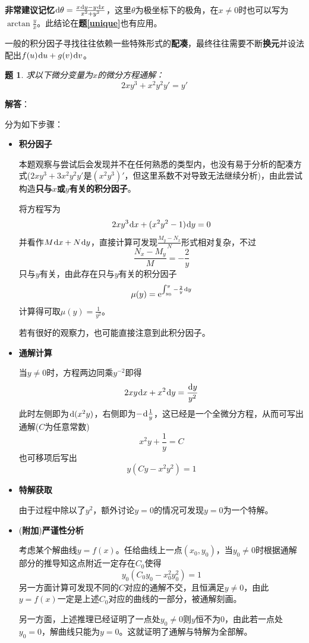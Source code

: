 \documentclass[a4paper,UTF8,fontset=windows,AutoFakeBold]{ctexart}
\newcommand*{\dr}{\hspace{0.07em}\mathrm{d}}
\newcommand*{\er}{\mathrm{e}}
\newcommand*{\extra}{\textbf{附加}}
\newcommand*{\note}{\noindent *}
\theoremstyle{ex}
\newtheorem{exercise}{题}
\newcommand{\exref}[1]{\textbf{题\;\ref{#1}\;}}
\newcommand{\sol}[1]{{\vspace{5pt}\kaishu\noindent\textbf{解答}：\vspace{-3pt}
\begin{compactitem}
    \item[] #1
\end{compactitem}
}}
\begin{document}
\note \textbf{非常建议记忆}$\dr\theta=\frac{x\dr y-y\dr x}{x^2+y^2}$，这里$\theta$为极坐标下的极角，在$x\ne0$时也可以写为$\arctan\frac{y}{x}$。此结论在\exref{unique}也有应用。

\note 一般的积分因子寻找往往依赖一些特殊形式的\textbf{配凑}，最终往往需要不断\textbf{换元}并设法配出$f(u)\dr u+g(v)\dr v$。

\begin{framed}
\begin{exercise}
    求以下微分变量为$x$的微分方程通解：
    $$2xy^3+x^2y^2y'=y'$$
\end{exercise}
\sol{
    分为如下步骤：
    \begin{itemize}
        \item \textbf{积分因子}
        
        本题观察与尝试后会发现并不在任何熟悉的类型内，也没有易于分析的配凑方式($2xy^3+3x^2y^2y'$是$(x^2y^3)'$，但这里系数不对导致无法继续分析)，由此尝试构造\textbf{只与$x$或$y$有关的积分因子}。

        将方程写为
        $$2xy^3\dr x+(x^2y^2-1)\dr y=0$$
        并看作$M\dr x+N\dr y$，直接计算可发现$\frac{M_y-N_x}{N}$形式相对复杂，不过
        $$\frac{N_x-M_y}{M}=-\frac{2}{y}$$
        只与$y$有关，由此存在只与$y$有关的积分因子
        $$\mu(y)=\er^{\int_{y_0}^y-\frac{2}{y}\dr y}$$
        计算得可取$\mu(y)=\frac{1}{y^2}$。

        \note 若有很好的观察力，也可能直接注意到此积分因子。

        \item \textbf{通解计算}
        
        当$y\ne0$时，方程两边同乘$y^{-2}$即得
        $$2xy\dr x+x^2\dr y=\frac{\dr y}{y^2}$$
        此时左侧即为$\dr(x^2y)$，右侧即为$-\dr\frac{1}{y}$，这已经是一个全微分方程，从而可写出通解($C$为任意常数)
        $$x^2y+\frac{1}{y}=C$$
        也可移项后写出
        $$y(Cy-x^2y^2)=1$$

        \item \textbf{特解获取}
        
        由于过程中除以了$y^2$，额外讨论$y=0$的情况可发现$y=0$为一个特解。

        \item (\extra)\textbf{严谨性分析}
        
        考虑某个解曲线$y=f(x)$。任给曲线上一点$(x_0,y_0)$，当$y_0\ne0$时根据通解部分的推导知这点附近一定存在$C_0$使得
        $$y_0(C_0y_0-x_0^2y_0^2)=1$$
        另一方面计算可发现不同的$C$对应的通解不交，且恒满足$y\ne0$，由此$y=f(x)$一定是上述$C_0$对应的曲线的一部分，被通解刻画。

        另一方面，上述推理已经证明了一点处$y_0\ne0$则$y$恒不为0，由此若一点处$y_0=0$，解曲线只能为$y=0$。这就证明了通解与特解为全部解。
    \end{itemize}
}
\end{framed}
\end{document}
